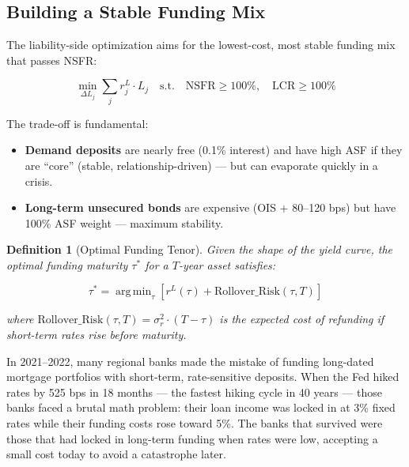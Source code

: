 \documentclass[12pt,a4paper]{article}
\DeclareMathOperator*{\argmin}{arg\,min}
\newtheorem{definition}{Definition}
\begin{document}
\subsection{Building a Stable Funding Mix}

The liability-side optimization aims for the lowest-cost, most stable
funding mix that passes NSFR:

\begin{equation}
  \min_{\Delta L_j} \sum_j r_j^L \cdot L_j
  \quad \text{s.t.} \quad
  \text{NSFR} \geq 100\%, \quad \text{LCR} \geq 100\%
\end{equation}

The trade-off is fundamental:
\begin{itemize}[noitemsep]
  \item \textbf{Demand deposits} are nearly free (0.1\% interest) and have
        high ASF if they are ``core'' (stable, relationship-driven) --- but
        can evaporate quickly in a crisis.
  \item \textbf{Long-term unsecured bonds} are expensive
        (OIS + 80--120 bps) but have 100\% ASF weight --- maximum stability.
\end{itemize}

\begin{definition}[Optimal Funding Tenor]
Given the shape of the yield curve, the optimal funding maturity $\tau^*$
for a $T$-year asset satisfies:

\begin{equation}
  \tau^* = \argmin_\tau \left[ r^L(\tau) + \text{Rollover\_Risk}(\tau, T) \right]
\end{equation}

where $\text{Rollover\_Risk}(\tau, T) = \sigma_r^2 \cdot (T - \tau)$ is the
expected cost of refunding if short-term rates rise before maturity.
\end{definition}

\begin{mdframed}[style=casestudy]
In 2021--2022, many regional banks made the mistake of funding long-dated
mortgage portfolios with short-term, rate-sensitive deposits.  When the Fed
hiked rates by 525 bps in 18 months --- the fastest hiking cycle in 40 years
--- those banks faced a brutal math problem: their loan income was locked in
at 3\% fixed rates while their funding costs rose toward 5\%.  The banks that
survived were those that had locked in long-term funding when rates were low,
accepting a small cost today to avoid a catastrophe later.
\end{mdframed}
\end{document}
